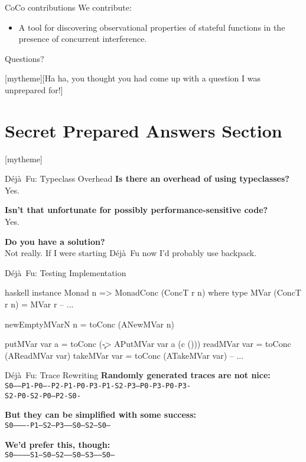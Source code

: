 \documentclass{beamer}
\newcommand{\sectiontext}[2]{
   \setbeamertemplate{section page}[mytheme][#2]
   \section{#1}
   \setbeamertemplate{section page}[mytheme]
}
\newcommand{\dejafu}{D\'{e}j\`{a}~Fu}
\begin{document}
\begin{frame}{CoCo contributions}
  We contribute:

  \begin{itemize}
  \item A tool for discovering observational properties of stateful
    functions in the presence of concurrent interference.
\end{itemize}
\end{frame}

\begin{frame}[standout]
  Questions?
\end{frame}

\appendix

\sectiontext{Secret Prepared Answers Section}{Ha ha, you thought you had come up with a question I was unprepared for!}

\begin{frame}{\dejafu{}: Typeclass Overhead}
  \textbf{Is there an overhead of using typeclasses?}\\
  Yes.

  \textbf{Isn't that unfortunate for possibly performance-sensitive code?}\\
  Yes.

  \textbf{Do you have a solution?}\\
  Not really.  If I were starting \dejafu{} now I'd probably use backpack.
\end{frame}

\begin{frame}[fragile]{\dejafu{}: Testing Implementation}
\begin{center}
\begin{cminted}{haskell}
instance Monad n => MonadConc (ConcT r n) where
  type MVar (ConcT r n) = MVar r
  -- ...

  newEmptyMVarN n = toConc (ANewMVar n)

  putMVar  var a = toConc (\c -> APutMVar var a (c ()))
  readMVar var   = toConc (AReadMVar var)
  takeMVar var   = toConc (ATakeMVar var)
  -- ...
\end{cminted}
\end{center}
\end{frame}

\begin{frame}{\dejafu{}: Trace Rewriting}
  \textbf{Randomly generated traces are not nice:}\\
  \texttt{S0-----P1-P0----P2-P1-P0-P3-P1-S2-P3--P0-P3-P0-P3-}\\
  \texttt{S2-P0-S2-P0--P2-S0-}

  \textbf{But they can be simplified with some success:}\\
  \texttt{S0----------P1---S2--P3-----S0---S2---S0---}

  \textbf{We'd prefer this, though:}\\
  \texttt{S0------------S1---S0--S2-----S0--S3-----S0--}
\end{frame}
\end{document}
